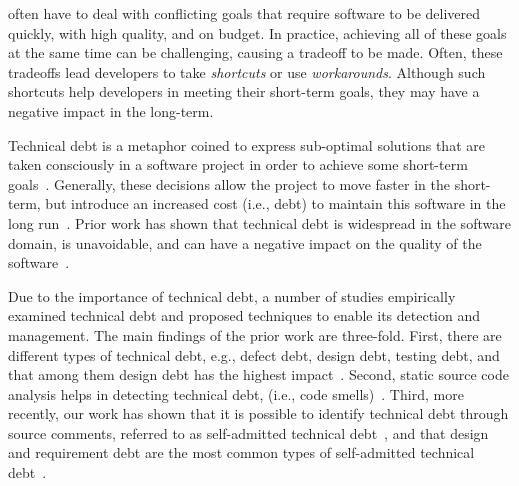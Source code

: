 \documentclass[10pt,journal,compsoc]{IEEEtran}
\newcommand{\SATD}{self-admitted technical debt\xspace}
\begin{document}

 often have to deal with conflicting goals that require software to be delivered quickly, with high quality, and on budget. In practice, achieving all of these goals at the same time can be challenging, causing a tradeoff to be made. Often, these tradeoffs lead developers to take \emph{shortcuts} or use \emph{workarounds}. Although such shortcuts help developers in meeting their short-term goals, they may have a negative impact in the long-term.

Technical debt is a metaphor coined to express sub-optimal solutions that are taken consciously in a software project in order to achieve some short-term goals~\cite{Cunningham1992WPM}. Generally, these decisions allow the project to move faster in the short-term, but introduce an increased cost (i.e., debt) to maintain this software in the long run~\cite{Seaman2011,Kruchten2013IWMTD}. Prior work has shown that technical debt is widespread in the software domain, is unavoidable, and can have a negative impact on the quality of the software~\cite{Lim2012Software}.

Due to the importance of technical debt, a number of studies empirically examined technical debt and proposed techniques to enable its detection and management. The main findings of the prior work are three-fold. First, there are different types of technical debt, e.g., defect debt, design debt, testing debt, and that among them design debt has the highest impact~\cite{Alves2014MTD,Marinescu2012IBM}. Second, static source code analysis helps in detecting technical debt, (i.e., code smells)~\cite{Marinescu2004ICSM,Marinescu2010CSMR,Zazworka2013CSE}. Third, more recently, our work has shown that it is possible to identify technical debt through source comments, referred to as  \SATD~\cite{Potdar2014ICSME}, and that design and requirement debt are the most common types of \SATD~\cite{Maldonado2015MTD}.
\end{document}
